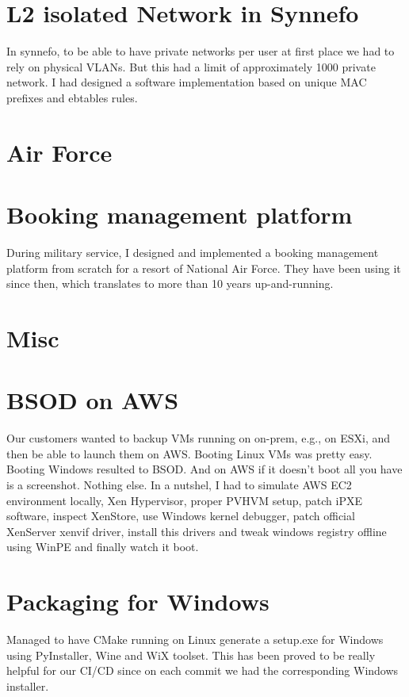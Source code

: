 \documentclass[margin,centered]{res}
\let\footnote=\endnote
\begin{document}
\begin{resume}
\section{\sc L2 isolated Network in Synnefo}
In synnefo, to be able to have private networks per user at first place we
had to rely on physical VLANs. But this had a limit of approximately 1000
private network. I had designed a software implementation based on unique MAC
prefixes and ebtables rules.

\section{Air Force}

\section{\sc Booking management platform}
During military service, I designed and implemented a booking management
platform \footnote{https://github.com/dimara/keda} from scratch for a resort of
National Air Force. They have been using it since then, which translates to
more than 10 years up-and-running.

\section{Misc}

\section{\sc BSOD on AWS}
Our customers wanted to backup VMs running on on-prem, e.g., on ESXi, and then
be able to launch them on AWS. Booting Linux VMs was pretty easy. Booting
Windows resulted to BSOD. And on AWS if it doesn't boot all you have is a
screenshot. Nothing else. In a nutshel, I had to simulate AWS EC2 environment
locally, Xen Hypervisor, proper PVHVM setup, patch iPXE software, inspect
XenStore, use Windows kernel debugger, patch official XenServer xenvif driver,
install this drivers and tweak windows registry offline using WinPE and
finally watch it boot.

\section{\sc Packaging for Windows}
Managed to have CMake running on Linux generate a setup.exe for Windows using
PyInstaller, Wine and WiX toolset. This has been proved to be really helpful for
our CI/CD since on each commit we had the corresponding Windows installer.


\end{resume}
\end{document}
